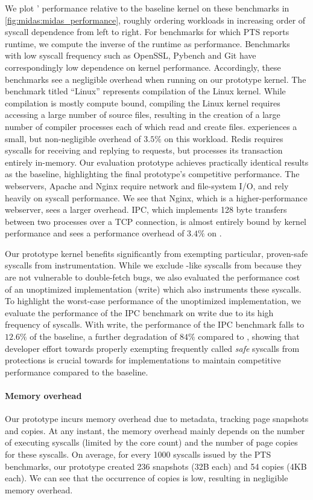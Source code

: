 We plot \midas' performance relative to the baseline kernel on
these benchmarks in \autoref{fig:midas:midas_performance}, roughly ordering
workloads in increasing order of syscall dependence from left to right.
For benchmarks for which PTS reports runtime, we compute the inverse
of the runtime as performance.
Benchmarks with low syscall frequency such as OpenSSL,
Pybench and Git have correspondingly low dependence on kernel performance.
Accordingly, these benchmarks see a negligible overhead when running
on our prototype kernel.
The benchmark titled ``Linux'' represents compilation of the Linux kernel.
While compilation is mostly compute bound, compiling the Linux kernel requires
accessing a large number of source files, resulting in the creation
of a large number of compiler processes each of which read and create
files.
\midas experiences a small, but non-negligible overhead of $3.5\%$ on this workload.
Redis requires syscalls for receiving and replying to requests, but
processes its transaction entirely in-memory.
Our evaluation prototype achieves practically identical results as the baseline,
highlighting the final prototype's competitive performance.
The webservers, Apache and Nginx require network and file-system I/O,
and rely heavily on syscall performance.
We see that Nginx, which is a higher-performance webserver, sees a larger
overhead.
IPC, which implements 128 byte transfers between
two processes over a TCP connection, is almost entirely bound by kernel
performance and sees a performance overhead of $3.4\%$ on \midas.

Our prototype \midas kernel benefits significantly from
exempting particular, proven-safe syscalls from instrumentation.
While we exclude -like syscalls from \midas because they
are not vulnerable to double-fetch bugs, we also evaluated the
performance cost of an unoptimized implementation (\midas{+}write)
which also instruments these syscalls.
To highlight the worst-case performance of the unoptimized implementation,
we evaluate the performance of the IPC benchmark on \midas{+}write due
to its high frequency of  syscalls.
With \midas{+}write, the performance of the IPC benchmark falls to
$12.6\%$ of the baseline, a further degradation of $84\%$ compared
to \midas, showing that developer effort towards properly exempting
frequently called \emph{safe} syscalls from \midas protections is crucial
towards for implementations to maintain competitive performance
compared to the baseline.

\paragraph{Memory overhead}
Our prototype incurs memory overhead due to metadata, tracking page snapshots
and copies.
At any instant, the memory overhead mainly depends on the number of executing
syscalls (limited by the core count) and the number of page copies for these
syscalls.
On average, for every 1000 syscalls issued by the PTS benchmarks, our prototype
created 236 snapshots (32B each) and 54 copies (4KB each).
We can see that the occurrence of copies is low, resulting in negligible
memory overhead.

